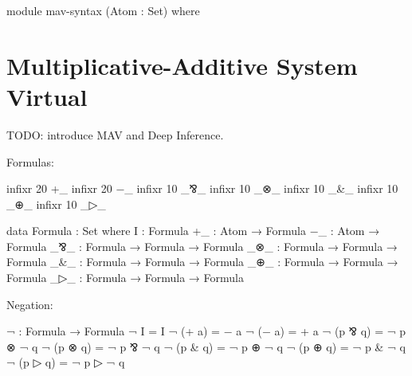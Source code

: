 \begin{code}[hide]
module mav-syntax (Atom : Set) where
\end{code}
\section{Multiplicative-Additive System Virtual}\label{sec:mav-syntax}

TODO: introduce MAV and Deep Inference.

Formulas:

\begin{code}[hide]
infixr 20 +_ 
infixr 20 −_ 
infixr 10 _⅋_
infixr 10 _⊗_
infixr 10 _&_
infixr 10 _⊕_
infixr 10 _▷_
\end{code}

\begin{code}
data Formula : Set where
  I    : Formula
  +_   : Atom → Formula
  −_   : Atom → Formula
  _⅋_  : Formula → Formula → Formula
  _⊗_  : Formula → Formula → Formula
  _&_  : Formula → Formula → Formula
  _⊕_  : Formula → Formula → Formula
  _▷_  : Formula → Formula → Formula
\end{code}

Negation:

\begin{code}
¬ : Formula → Formula
¬ I        = I
¬ (+ a)    = − a
¬ (− a)    = + a
¬ (p  ⅋  q)  = ¬ p  ⊗  ¬ q
¬ (p  ⊗  q)  = ¬ p  ⅋  ¬ q
¬ (p  &  q)  = ¬ p  ⊕  ¬ q
¬ (p  ⊕  q)  = ¬ p  &  ¬ q
¬ (p  ▷  q)  = ¬ p  ▷  ¬ q
\end{code}

